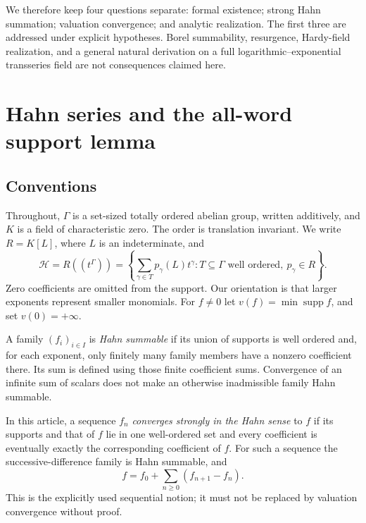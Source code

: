 \documentclass[11pt,a4paper]{article}
\theoremstyle{definition}
\theoremstyle{remark}
\newcommand{\HH}{\mathscr H}
\newcommand{\supp}{\operatorname{supp}}
\begin{document}
We therefore keep four questions separate: formal existence; strong Hahn
summation; valuation convergence; and analytic realization. The first three
are addressed under explicit hypotheses. Borel summability, resurgence,
Hardy-field realization, and a general natural derivation on a full
logarithmic--exponential transseries field are not consequences claimed here.

\section{Hahn series and the all-word support lemma}
\label{sec:words}

\subsection{Conventions}
Throughout, $\Gamma$ is a set-sized totally ordered abelian group, written
additively, and $K$ is a field of characteristic zero. The order is
translation invariant. We write $R=K[L]$, where $L$ is an indeterminate, and
\[
 \HH=R((t^\Gamma))
 =\left\{\sum_{\gamma\in T}p_\gamma(L)t^\gamma:
            T\subseteq\Gamma\text{ well ordered},\ p_\gamma\in R\right\}.
\]
Zero coefficients are omitted from the support. Our orientation is that
larger exponents represent smaller monomials. For $f\ne0$ let
$v(f)=\min\supp f$, and set $v(0)=+\infty$.

A family $(f_i)_{i\in I}$ is \emph{Hahn summable} if its union of supports is
well ordered and, for each exponent, only finitely many family members
have a nonzero coefficient there. Its sum is defined using those finite
coefficient sums. Convergence of an infinite sum of scalars does not make
an otherwise inadmissible family Hahn summable.

In this article, a sequence $f_n$ \emph{converges strongly in the Hahn sense}
to $f$ if its supports and that of $f$ lie in one well-ordered set and every
coefficient is eventually exactly the corresponding coefficient of $f$.
For such a sequence the successive-difference family is Hahn summable, and
\[
 f=f_0+\sum_{n\ge0}(f_{n+1}-f_n).
\]
This is the explicitly used sequential notion; it must not be replaced by
valuation convergence without proof.
\end{document}
